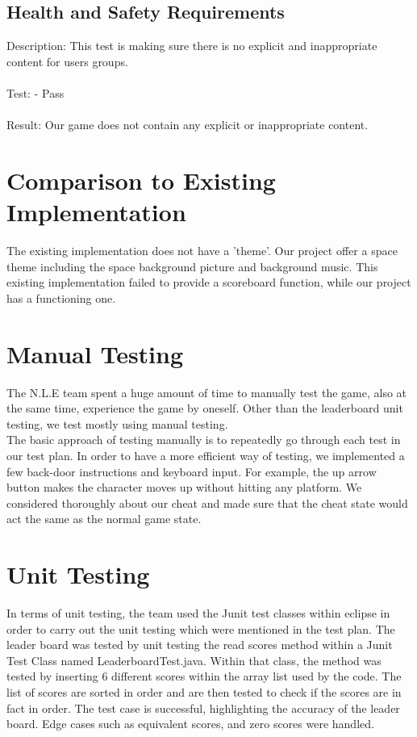\documentclass[12pt, titlepage]{article}
\begin{document}
\subsection{Health and Safety Requirements}
Description: This test is making sure there is no explicit and inappropriate content for users groups.\\\\
Test:  - Pass\\\\
Result: Our game does not contain any explicit or inappropriate content.

\section{Comparison to Existing Implementation}	

The existing implementation does not have a 'theme'.  Our project offer a space theme including the space background picture and background music.  This existing implementation failed to provide a scoreboard function, while our project has a functioning one.    
\section{Manual Testing}
The N.L.E team spent a huge amount of time to manually test the game, also at the same time, experience the game by oneself. Other than the leaderboard unit testing, we test mostly using manual testing.\\
The basic approach of testing manually is to repeatedly go through each test in our test plan. In order to have a more efficient way of testing, we implemented a few back-door instructions and keyboard input. For example, the up arrow button makes the character moves up without hitting any platform. We considered thoroughly about our cheat and made sure that the cheat state would act the same as the normal game state.\\
\section{Unit Testing}

In terms of unit testing, the team used the Junit test classes within eclipse in order to carry out the unit testing which were mentioned in the test plan. The leader board was tested by unit testing the read scores method within a Junit Test Class named LeaderboardTest.java. Within that class, the method was tested by inserting 6 different scores within the array list used by the code. The list of scores are sorted in order and are then tested to check if the scores are in fact in order. The test case is successful, highlighting the accuracy of the leader board. Edge cases such as equivalent scores, and zero scores were handled. 
\end{document}
